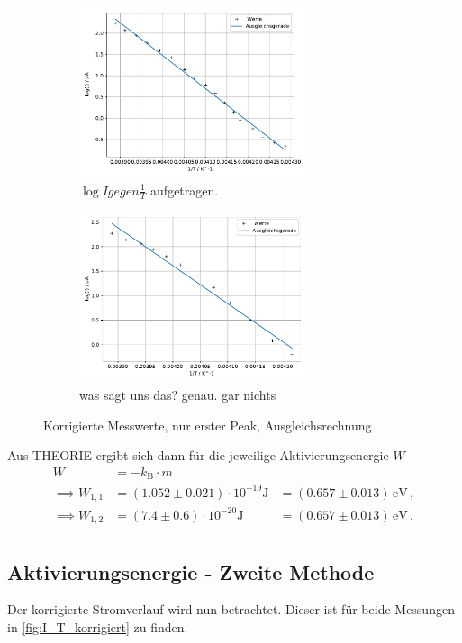  \begin{figure}
    \begin{subfigure}[b]{.5\linewidth}
      \centering
      \includegraphics[height=5cm, keepaspectratio]{build/log(I)_1durchT_1.pdf}
      \caption{$\log{I} gegen \frac{1}{T}$ aufgetragen.}
      \label{fig:log_I_1_durch_T_Messung_1}
    \end{subfigure}
    \begin{subfigure}[b]{.5\linewidth}
      \centering
      \includegraphics[height=5cm, keepaspectratio]{build/log(I)_1durchT_2.pdf}
      \caption{was sagt uns das? genau. gar nichts}
      \label{fig:log_I_1_durch_T_Messung 2}
    \end{subfigure}
    \caption{Korrigierte Messwerte, nur erster Peak, Ausgleichsrechnung}
  \end{figure} %

  \noindent
  Aus THEORIE ergibt sich dann für die jeweilige Aktivierungsenergie $W$
  \begin{align*}
    W   &= -k_\text{B} \cdot m \\
    \implies W_{1,1} &= (1.052 \pm 0.021) \cdot 10^{-19} \si{\joule} &= (0.657 \pm 0.013) \, \si{\electronvolt} \, , \\
    \implies W_{1,2} &= (7.4 \pm 0.6) \cdot 10^{-20} \si{\joule} &= (0.657 \pm 0.013) \, \si{\electronvolt}  \, .\\
  \end{align*}

\subsection{Aktivierungsenergie - Zweite Methode}
  Der korrigierte Stromverlauf wird nun betrachtet.
  Dieser ist für beide Messungen in \autoref{fig:I_T_korrigiert} zu finden.

